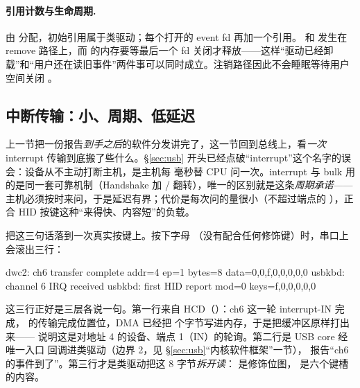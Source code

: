 
\paragraph{引用计数与生命周期.}  由  分配，初始引用属于类驱动；每个打开的 event fd 再加一个引用。 和  发生在 remove 路径上，而  的内存要等最后一个 fd 关闭才释放——这样“驱动已经卸载”和“用户还在读旧事件”两件事可以同时成立。注销路径因此不会睡眠等待用户空间关闭 。

\subsection{中断传输：小、周期、低延迟}
\label{sec:usb-interrupt}

上一节把一份报告\emph{到手之后}的软件分发讲完了，这一节回到总线上，看\emph{一次} interrupt 传输到底搬了些什么。§\ref{sec:usb} 开头已经点破“interrupt”这个名字的误会：设备从不主动打断主机，是主机每  毫秒替 CPU 问一次。interrupt 与 bulk 用的是同一套可靠机制（Handshake 加 / 翻转），唯一的区别就是这条\emph{周期承诺}——主机必须按时来问，于是延迟有界；代价是每次问的量很小（不超过端点的 ），正合 HID 按键这种“来得快、内容短”的负载。

把这三句话落到一次真实按键上。按下字母 （没有配合任何修饰键）时，串口上会滚出三行：

\begin{txtcode}
dwc2: ch6 transfer complete addr=4 ep=1 bytes=8 data=0,0,f,0,0,0,0,0
usbkbd: channel 6 IRQ received
usbkbd: first HID report mod=0 keys=f,0,0,0,0,0
\end{txtcode}

这三行正好是三层各说一句。第一行来自 HCD（）：ch6 这一轮 interrupt-IN 完成， 的传输完成位置位，DMA 已经把  个字节写进内存，于是把缓冲区原样打出来—— 说明这是对地址 4 的设备、端点 1（IN）的轮询。第二行是 USB core 经唯一入口  回调进类驱动（边界 2，见 §\ref{sec:usb}“内核软件框架”一节）， 报告“ch6 的事件到了”。第三行才是类驱动把这 8 字节\emph{拆开读}： 是修饰位图， 是六个键槽的内容。

